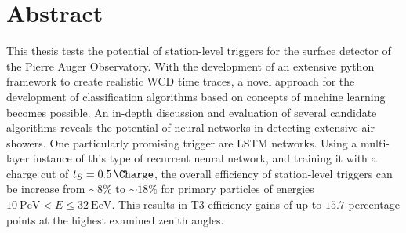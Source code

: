 
\chapter*{Abstract}

This thesis tests the potential of station-level triggers for the surface detector of the Pierre Auger Observatory. With the development of an extensive python 
framework to create realistic WCD time traces, a novel approach for the development of classification algorithms based on concepts of machine learning becomes 
possible. An in-depth discussion and evaluation of several candidate algorithms reveals the potential of neural networks in detecting extensive air showers. One 
particularly promising trigger are LSTM networks. Using a multi-layer instance of this type of recurrent neural network, and training it with a charge cut of 
$t_S = \SI{0.5}{\Charge}$, the overall efficiency of station-level triggers can be increase from $\sim8\%$ to $\sim18\%$ for primary particles of energies 
$\SI{10}{\peta\electronvolt} < E \leq \SI{32}{\exa\electronvolt}$. This results in T3 efficiency gains of up to $15.7$ percentage points at the highest examined
zenith angles.